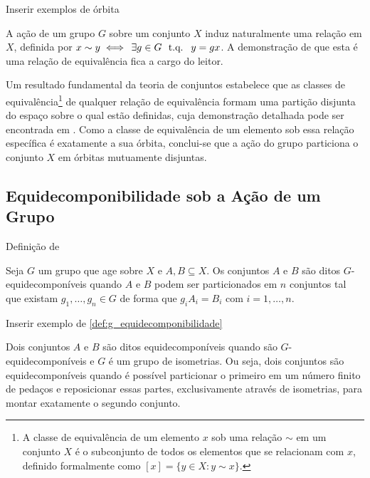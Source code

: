 \begin{exemplo}
    \label{ex:orbita}
    Inserir exemplos de órbita
\end{exemplo}


A ação de um grupo \(G\) sobre um conjunto \(X\) induz naturalmente uma relação em \(X\), definida por \(x \sim y \iff \exists g \in G \tq y = gx\). A demonstração de que esta é uma relação de equivalência fica a cargo do leitor.

Um resultado fundamental da teoria de conjuntos estabelece que as classes de equivalência\footnote{A classe de equivalência de um elemento \(x\) sob uma relação \(\sim\) em um conjunto \(X\) é o subconjunto de todos os elementos que se relacionam com \(x\), definido formalmente como \([x] = \{ y \in X : y \sim x \}\).} de qualquer relação de equivalência formam uma partição disjunta do espaço sobre o qual estão definidas, cuja demonstração detalhada pode ser encontrada em \textcite[p.~216]{hammack2018}. Como a classe de equivalência de um elemento sob essa relação específica é exatamente a sua órbita, conclui-se que a ação do grupo particiona o conjunto \(X\) em órbitas mutuamente disjuntas.



\subsection{Equidecomponibilidade sob a Ação de um Grupo}
\label{subsec:equidecomponibilidade}

Definição de \textcite[p.~25]{tomkowicz2016}

\begin{definicao}[\(G\)-Equidecomponibilidade]
    Seja \(G\) um grupo que age sobre \(X\) e \(A,B \subseteq X\). Os conjuntos \(A\)  e \(B\) são ditos \(G\)-equidecomponíveis quando \(A\) e \(B\) podem ser particionados em \(n\) conjuntos tal que existam \(g_1, \dots, g_n \in G\) de forma que \(g_iA_i = B_i\) com \(i = 1, \dots, n.\)

\end{definicao}

\begin{exemplo}
    \label{ex:g_equidecomponibilidade}
    Inserir exemplo de \autoref{def:g_equidecomponibilidade}
\end{exemplo}

\begin{definicao}
    \label{def:equidecomponiveis}
    Dois conjuntos \(A\) e \(B\) são ditos equidecomponíveis quando são \(G\)-equidecomponíveis e \(G\) é um grupo de isometrias. Ou seja, dois conjuntos são equidecomponíveis quando é possível particionar o primeiro em um número finito de pedaços e reposicionar essas partes, exclusivamente através de isometrias, para montar exatamente o segundo conjunto.
\end{definicao}

